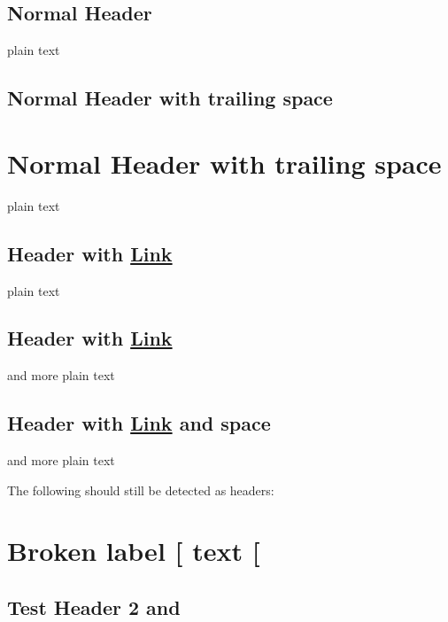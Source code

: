 
\def\mytitle{MultiMarkdown Headers Test}
\def\latexmode{memoir}

\section{Normal Header}
\label{normalheader}

plain text

\section{Normal Header with trailing space}
\label{normalheaderwithtrailingspace}

\chapter{Normal Header with trailing space}
\label{normalheaderwithtrailingspace}

plain text

\section{Header with \href{http://www.google.com}{Link}}
\label{headerwithlink}

plain text

\section{Header with \href{http://www.google.com}{Link}}
\label{headerwithlink}

and more plain text

\section{Header with \href{http://www.google.com}{Link} and space}
\label{headerwithlinkandspace}

and more plain text

The following should still be detected as headers:

\chapter{Broken label [ text [}
\label{brokenlabeltext}

\section{Test Header 2 and}
\label{label}

